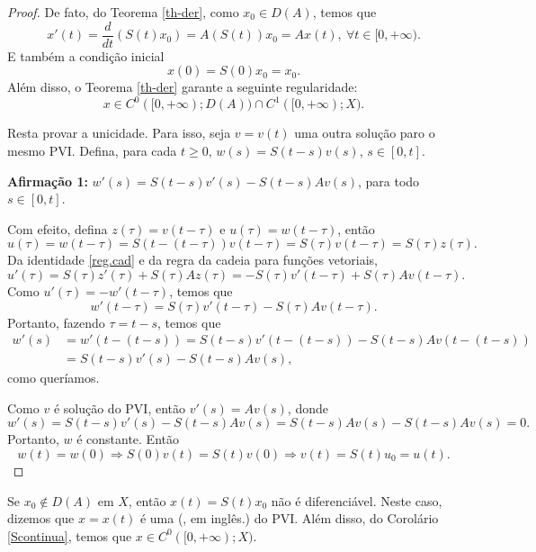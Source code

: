 \begin{proof}
De fato, do Teorema \ref{th-der}, como $x_0\in D(A)$, temos que
\[x'(t)=\frac{d}{dt}(S(t)x_0)=A(S(t))x_0=Ax(t),\ \forall t\in [0,+\infty).\]
E também a condição inicial
\[x(0)=S(0)x_0=x_0.\]
Além disso, o Teorema \ref{th-der} garante a seguinte regularidade:
\[x\in  C^0([0,+\infty);D(A))\cap C^1([0,+\infty);X).\]

Resta provar a unicidade. Para isso,  seja $v=v(t)$ uma outra solução paro o mesmo PVI. Defina, para cada $t\geq 0$,  $w(s)=S(t-s)v(s)$, $s\in [0,t]$.

\noindent\textbf{Afirmação 1:} $w'(s)=S(t-s)v'(s)-S(t-s)Av(s)$, para todo $s\in [0,t]$.

Com efeito, defina $z(\tau)=v(t-\tau)$ e $u(\tau)=w(t-\tau)$, então
\begin{equation*}
u(\tau)=w(t-\tau)=S(t-(t-\tau))v(t-\tau)=S(\tau)v(t-\tau)=S(\tau)z(\tau).
\end{equation*}
Da identidade \eqref{reg.cad} e da regra da cadeia para funções vetoriais,
\begin{equation*}
u'(\tau)=S(\tau)z'(\tau)+S(\tau)Az(\tau)= -S(\tau)v'(t-\tau)+S(\tau)Av(t-\tau).
\end{equation*}
Como $u'(\tau)=-w'(t-\tau)$, temos que 
\begin{equation*}
w'(t-\tau)=S(\tau)v'(t-\tau)-S(\tau)Av(t-\tau).
\end{equation*}
Portanto, fazendo $\tau=t-s$, temos que
\begin{align*}
w'(s)& =w'(t-(t-s))=S(t-s)v'(t-(t-s))-S(t-s)Av(t-(t-s))\\
& =S(t-s)v'(s)-S(t-s)Av(s),
\end{align*}
como queríamos.

Como $v$ é solução do PVI, então $v'(s)=Av(s)$, donde
 \[w'(s)=S(t-s)v'(s)-S(t-s)Av(s)=S(t-s)Av(s)-S(t-s)Av(s)=0.\]
Portanto, $w$ é constante. Então 
\[w(t)=w(0)\Rightarrow S(0)v(t)=S(t)v(0)\Rightarrow v(t)=S(t)u_0=u(t).\]
\end{proof}

\begin{remark}
Se {$x_0\not\in D(A)$} em $X$, então $x(t)=S(t)x_0$ {\color{red}não é diferenciável}. Neste caso, dizemos que $x=x(t)$ é uma  (, em inglês.)  do PVI. Além disso, do Corolário \ref{Scontinua}, temos que $x\in C^0([0,+\infty);X)$.
\end{remark}



